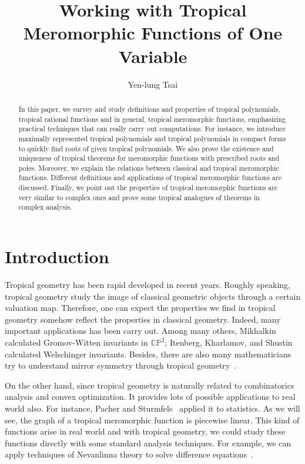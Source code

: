 \documentclass{amsart}
\title{Working with Tropical Meromorphic Functions of One Variable}
\author{Yen-lung Tsai}
\theoremstyle{definition}
\theoremstyle{remark}
\begin{document}
\maketitle
\begin{abstract}
In this paper, we survey and study definitions and properties of tropical polynomials, tropical rational functions and in general, tropical meromorphic functions, emphasizing practical techniques that can really carry out computations. For instance, we introduce maximally represented tropical polynomials and tropical polynomials in compact forms to quickly find roots of given tropical polynomials. We also prove the existence and uniqueness of tropical theorems for meromorphic functions with prescribed roots and poles.  Moreover, we explain the relations between classical and tropical meromorphic functions. Different definitions and applications of tropical meromorphic functions are discussed. Finally, we point out the properties of tropical meromorphic functions are very similar to complex ones and prove some tropical analogues of theorems in complex analysis.
\end{abstract}

\section{Introduction}
Tropical geometry has been rapid developed in recent years. Roughly speaking, tropical geometry study the image of classical geometric objects through a certain valuation map. Therefore, one can expect the properties we find in tropical geometry somehow reflect the properties in classical geometry. Indeed, many important applications has been carry out. Among many others, Mikhalkin~\cite{mikhalkin03, mikhalkin05} calculated Gromov-Witten invariants in ${\mathbb{CP}}^2$; Itenberg, Kharlamov, and Shustin~\cite{iks03} calculated Welschinger invariants. Besides, there are also many mathematicians try to understand mirror symmetry through tropical geometry~\cite{g10}.

On the other hand, since tropical geometry is naturally related to combinatorics analysis and convex optimization. It provides lots of possible applications to real world also. For instance, Pacher and Sturmfels~\cite{ps04} applied it to statistics. As we will see, the graph of a tropical meromorphic function is piecewise linear. This kind of functions arise in real world and with tropical geometry, we could study these functions directly with some standard analysis techniques. For example, we can apply techniques of Nevanlinna theory to solve difference equations~\cite{hs09, lt09}.
\end{document}
